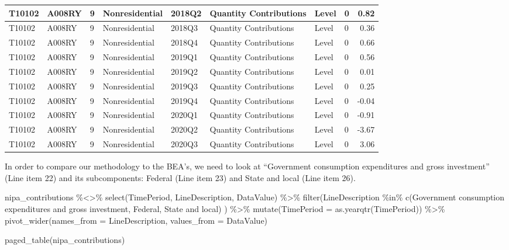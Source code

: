 \documentclass[
]{article}
\newenvironment{Shaded}{\begin{snugshade}}{\end{snugshade}}
\newcommand{\AttributeTok}[1]{\textcolor[rgb]{0.77,0.63,0.00}{#1}}
\newcommand{\FunctionTok}[1]{\textcolor[rgb]{0.00,0.00,0.00}{#1}}
\newcommand{\NormalTok}[1]{#1}
\newcommand{\SpecialCharTok}[1]{\textcolor[rgb]{0.00,0.00,0.00}{#1}}
\newcommand{\StringTok}[1]{\textcolor[rgb]{0.31,0.60,0.02}{#1}}
\begin{document}
\begin{tabular}{l|l|l|l|l|l|l|l|r}
\hline
T10102 & A008RY & 9 & Nonresidential & 2018Q2 & Quantity Contributions & Level & 0 & 0.82\\
\hline
T10102 & A008RY & 9 & Nonresidential & 2018Q3 & Quantity Contributions & Level & 0 & 0.36\\
\hline
T10102 & A008RY & 9 & Nonresidential & 2018Q4 & Quantity Contributions & Level & 0 & 0.66\\
\hline
T10102 & A008RY & 9 & Nonresidential & 2019Q1 & Quantity Contributions & Level & 0 & 0.56\\
\hline
T10102 & A008RY & 9 & Nonresidential & 2019Q2 & Quantity Contributions & Level & 0 & 0.01\\
\hline
T10102 & A008RY & 9 & Nonresidential & 2019Q3 & Quantity Contributions & Level & 0 & 0.25\\
\hline
T10102 & A008RY & 9 & Nonresidential & 2019Q4 & Quantity Contributions & Level & 0 & -0.04\\
\hline
T10102 & A008RY & 9 & Nonresidential & 2020Q1 & Quantity Contributions & Level & 0 & -0.91\\
\hline
T10102 & A008RY & 9 & Nonresidential & 2020Q2 & Quantity Contributions & Level & 0 & -3.67\\
\hline
T10102 & A008RY & 9 & Nonresidential & 2020Q3 & Quantity Contributions & Level & 0 & 3.06\\
\hline
\end{tabular}

In order to compare our methodology to the BEA's, we need to look at
``Government consumption expenditures and gross investment'' (Line item
22) and its subcomponents: Federal (Line item 23) and State and local
(Line item 26).

\begin{Shaded}
\begin{Highlighting}[]
\NormalTok{nipa\_contributions }\SpecialCharTok{\%\textless{}\textgreater{}\%}
  \FunctionTok{select}\NormalTok{(TimePeriod, LineDescription, DataValue) }\SpecialCharTok{\%\textgreater{}\%}
  \FunctionTok{filter}\NormalTok{(LineDescription }\SpecialCharTok{\%in\%} \FunctionTok{c}\NormalTok{(}\StringTok{\textquotesingle{}Government consumption expenditures and gross investment\textquotesingle{}}\NormalTok{, }\StringTok{\textquotesingle{}Federal\textquotesingle{}}\NormalTok{, }\StringTok{\textquotesingle{}State and local\textquotesingle{}}\NormalTok{)}
\NormalTok{  ) }\SpecialCharTok{\%\textgreater{}\%}  
  \FunctionTok{mutate}\NormalTok{(}\AttributeTok{TimePeriod =} \FunctionTok{as.yearqtr}\NormalTok{(TimePeriod)) }\SpecialCharTok{\%\textgreater{}\%}
  \FunctionTok{pivot\_wider}\NormalTok{(}\AttributeTok{names\_from =}\NormalTok{ LineDescription, }\AttributeTok{values\_from =}\NormalTok{ DataValue)}
  
\FunctionTok{paged\_table}\NormalTok{(nipa\_contributions)}
\end{Highlighting}
\end{Shaded}
\end{document}
